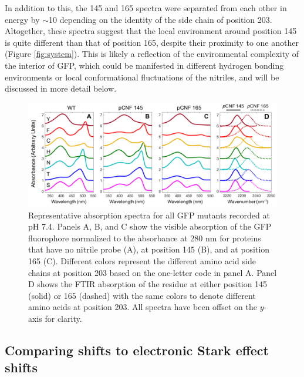 In addition to this, the \pCNF{} 145 and 165 spectra were separated from each other in energy by $\sim$10 \si{\wn} depending on the identity of the side chain of position 203.
Altogether, these spectra suggest that the local environment around position 145 is quite different than that of position 165, despite their proximity to one another (Figure \ref{fig:system}).
This is likely a reflection of the environmental complexity of the interior of GFP, which could be manifested in different hydrogen bonding environments or local conformational fluctuations of the nitriles, and will be discussed in more detail below.

\begin{figure}
    \center
    \includegraphics[width=\double]{figures-gfp-pKa/abs_spectra.png}
    \caption[Representative absorption spectra for all GFP mutants]{
        Representative absorption spectra for all GFP mutants recorded at pH 7.4. 
        Panels A, B, and C show the visible absorption of the GFP fluorophore normalized to the absorbance at 280 nm for proteins that have no nitrile probe (A), \pCNF{} at position 145 (B), and \pCNF{} at position 165 (C). 
        Different colors represent the different amino acid side chains at position 203 based on the one-letter code in panel A. 
        Panel D shows the FTIR absorption of the \pCNF{} residue at either position 145 (solid) or 165 (dashed) with the same colors to denote different amino acids at position 203. 
        All spectra have been offset on the $y$-axis for clarity.
    }
    \label{fig:abs_spectra}
\end{figure}

\subsection{Comparing \pKa{} shifts to electronic Stark effect shifts}

